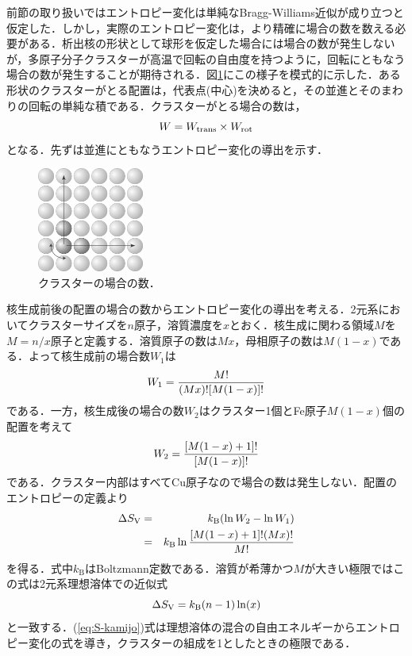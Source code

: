 \documentclass[a4j,10pt]{jarticle}
\begin{document}
前節の取り扱いではエントロピー変化は単純なBragg-Williams近似が成り立つと仮定した．しかし，実際のエントロピー変化は，より精確に場合の数を数える必要がある．析出核の形状として球形を仮定した場合には場合の数が発生しないが，多原子分子クラスターが高温で回転の自由度を持つように，回転にともなう場合の数が発生することが期待される．図\ref{SchemRotation}にこの様子を模式的に示した．ある形状のクラスターがとる配置は，代表点(中心)を決めると，その並進とそのまわりの回転の単純な積である．クラスターがとる場合の数は，
\begin{equation}
W = W_{\rm trans} \times W_{\rm rot}
\end{equation}
となる．先ずは並進にともなうエントロピー変化の導出を示す\cite[小田垣卒論]{Odagaki03}．

\begin{figure}\begin{center}
\includegraphics[width=35mm]{./figs/SchemRotation2.eps}
\caption{クラスターの場合の数．}
\label{SchemRotation}
\end{center}\end{figure}

核生成前後の配置の場合の数からエントロピー変化の導出を考える．2元系においてクラスターサイズを$n$原子，溶質濃度を$x$とおく．核生成に関わる領域$M$を$M = n/x$原子と定義する．溶質原子の数は$Mx$，母相原子の数は$M(1-x)$である．よって核生成前の場合数$W_{1}$は
\begin{equation}
W_{1}=\frac{M!}{(Mx)![M(1-x)]!}
\vspace{.5cm}
\label{eq:W1-binary}
\end{equation}
である．一方，核生成後の場合の数$W_{2}$はクラスター1個とFe原子$M(1-x)$個の配置を考えて
\begin{equation}
W_{2} = \frac{[M(1-x)+1]!}{[M(1-x)]!}
\vspace{.5cm}
\label{eq:W2-binary}
\end{equation}
である．クラスター内部はすべてCu原子なので場合の数は発生しない．配置のエントロピーの定義より
\begin{eqnarray}
\Delta S_\mathrm{V} &=& k_\mathrm{B} (\ln W_{2} - \ln W_{1}) \nonumber \\
&=& k_\mathrm{B} \ln \frac{[M(1-x)+1]!(Mx)!}{M!}
\vspace{.5cm}
\label{eq:S-binary}
\end{eqnarray}
を得る．式中$k_\mathrm{B}$はBoltzmann定数である．溶質が希薄かつ$M$が大きい極限ではこの式は2元系理想溶体での近似式
\begin{equation}
\Delta S_\mathrm{V} = k_\mathrm{B} ( n - 1 ) \ln (x) 
\vspace{.5cm}
\label{eq:S-kamijo}
\end{equation}
と一致する．(\ref{eq:S-kamijo})式は理想溶体の混合の自由エネルギーからエントロピー変化の式を導き，クラスターの組成を1としたときの極限である．
\end{document}
